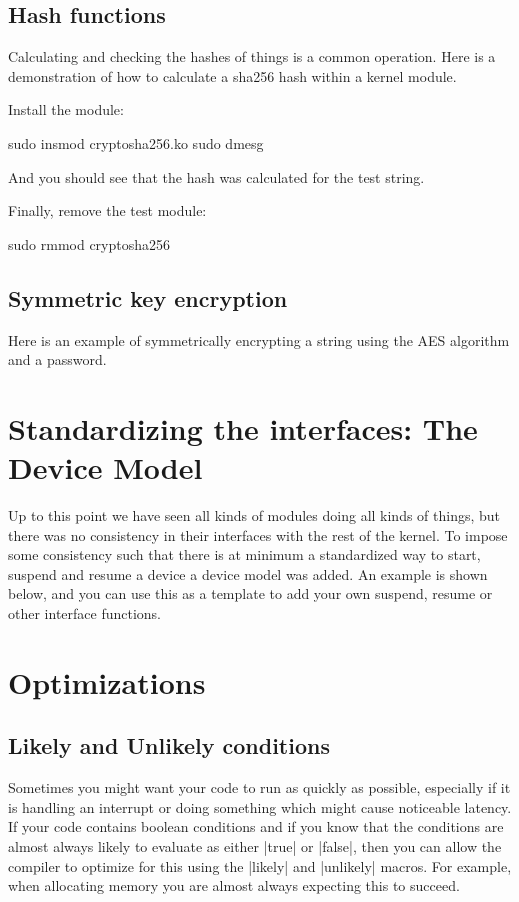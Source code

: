\documentclass[10pt, oneside]{book}
\begin{document}
\subsection{Hash functions}
\label{sec:hashfunc}

Calculating and checking the hashes of things is a common operation.
Here is a demonstration of how to calculate a sha256 hash within a kernel module.


Install the module:

\begin{codebash}
sudo insmod cryptosha256.ko
sudo dmesg
\end{codebash}

And you should see that the hash was calculated for the test string.

Finally, remove the test module:

\begin{codebash}
sudo rmmod cryptosha256
\end{codebash}

\subsection{Symmetric key encryption}
\label{sec:org2fab20b}
Here is an example of symmetrically encrypting a string using the AES algorithm and a password.


\section{Standardizing the interfaces: The Device Model}
\label{sec:device_model}
Up to this point we have seen all kinds of modules doing all kinds of things, but there was no consistency in their interfaces with the rest of the kernel.
To impose some consistency such that there is at minimum a standardized way to start, suspend and resume a device a device model was added.
An example is shown below, and you can use this as a template to add your own suspend, resume or other interface functions.


\section{Optimizations}
\label{sec:optimization}
\subsection{Likely and Unlikely conditions}
\label{sec:likely_unlikely}
Sometimes you might want your code to run as quickly as possible, especially if it is handling an interrupt or doing something which might cause noticeable latency.
If your code contains boolean conditions and if you know that the conditions are almost always likely to evaluate as either \cpp|true| or \cpp|false|,
then you can allow the compiler to optimize for this using the \cpp|likely| and \cpp|unlikely| macros.
For example, when allocating memory you are almost always expecting this to succeed.
\end{document}
